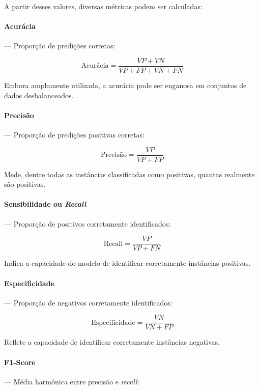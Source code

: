 \documentclass[12pt]{article}
\begin{document}
A partir desses valores, diversas métricas podem ser calculadas:

\paragraph{Acurácia} --- Proporção de predições corretas:

\begin{equation}
\text{Acurácia} = \frac{VP + VN}{VP + FP + VN + FN}
\end{equation}

Embora amplamente utilizada, a acurácia pode ser enganosa em conjuntos de dados desbalanceados.

\paragraph{Precisão} --- Proporção de predições positivas corretas:

\begin{equation}
\text{Precisão} = \frac{VP}{VP + FP}
\end{equation}

Mede, dentre todas as instâncias classificadas como positivas, quantas realmente são positivas.

\paragraph{Sensibilidade ou \emph{Recall}} --- Proporção de positivos corretamente identificados:

\begin{equation}
\text{Recall} = \frac{VP}{VP + FN}
\end{equation}

Indica a capacidade do modelo de identificar corretamente instâncias positivas.

\paragraph{Especificidade} --- Proporção de negativos corretamente identificados:

\begin{equation}
\text{Especificidade} = \frac{VN}{VN + FP}
\end{equation}

Reflete a capacidade de identificar corretamente instâncias negativas.

\paragraph{F1-Score} --- Média harmônica entre precisão e \emph{recall}:
\end{document}
